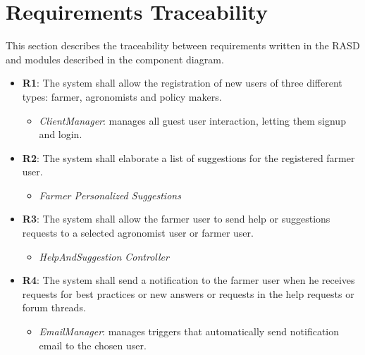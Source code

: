\documentclass{article}
\begin{document}
        \newpage
        
        
        
                
\section{Requirements Traceability}

This section describes the traceability between requirements written in the RASD and modules described in the component diagram.

    \setlength{\parskip}{0em}

    \begin{itemize}
    
        \item \textbf{R1}: The system shall allow the registration of new users of three different types: farmer, agronomists and policy makers.
            \begin{itemize}
                \item \textit{ClientManager}: manages all guest user interaction, letting them signup and login.
            \end{itemize}
        
        \item \textbf{R2}: The system shall elaborate a list of suggestions for the registered farmer user.
            \begin{itemize}
                \item \textit{Farmer Personalized Suggestions}
            \end{itemize}
        
        \item \textbf{R3}: The system shall allow the farmer user to send help or suggestions requests to a selected agronomist user or farmer user.
            \begin{itemize}
                \item \textit{HelpAndSuggestion Controller}
            \end{itemize}
        
        \item \textbf{R4}: The system shall send a notification to the farmer user when he receives requests for best practices or new answers or requests in the help requests or forum threads.
            \begin{itemize}
                \item \textit{EmailManager}: manages triggers that automatically send notification email to the chosen user.
            \end{itemize}


\end{itemize}
\end{document}

